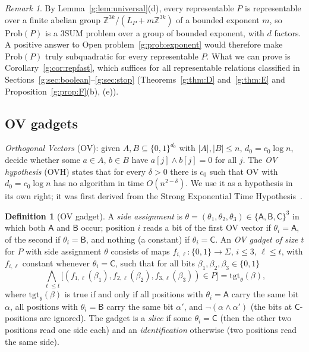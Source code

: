\documentclass[11pt]{article}
\theoremstyle{definition}
\newtheorem{definition}[theorem]{Definition}
\theoremstyle{remark}
\newtheorem{remark}[theorem]{Remark}
\newcommand{\Z}{\mathbb{Z}}
\newcommand{\Prob}{\mathrm{Prob}}
\begin{document}
\begin{remark}\label{g:rem:repexp}
By Lemma~\ref{g:lem:universal}(d), every representable $P$ is representable over a finite abelian group $\Z^{3k}/(L_P+m\Z^{3k})$ of a bounded exponent $m$, so $\Prob(P)$ is a 3SUM problem over a group of bounded exponent, with $d$ factors. A positive answer to Open problem~\ref{g:prob:exponent} would therefore make $\Prob(P)$ truly subquadratic for every representable $P$. What we can prove is Corollary~\ref{g:cor:repfast}, which suffices for all representable relations classified in Sections~\ref{g:sec:boolean}--\ref{g:sec:stop} (Theorems~\ref{g:thm:D} and~\ref{g:thm:E} and Proposition~\ref{g:prop:F}(b), (e)).
\end{remark}

\subsection{OV gadgets}\label{g:sec:gadgets}

\emph{Orthogonal Vectors} (OV): given $A,B\subseteq\{0,1\}^{d_0}$ with $|A|,|B|\le n$, $d_0=c_0\log n$, decide whether some $a\in A$, $b\in B$ have $a[j]\wedge b[j]=0$ for all $j$. The \emph{OV hypothesis} (OVH) states that for every $\delta>0$ there is $c_0$ such that OV with $d_0=c_0\log n$ has no algorithm in time $O(n^{2-\delta})$. We use it as a hypothesis in its own right; it was first derived from the Strong Exponential Time Hypothesis~\cite{Wil05}.

\begin{definition}[OV gadget]\label{g:def:gadget}
A \emph{side assignment} is $\theta=(\theta_1,\theta_2,\theta_3)\in\{\mathsf A,\mathsf B,\mathsf C\}^3$ in which both $\mathsf A$ and $\mathsf B$ occur; position $i$ reads a bit of the first OV vector if $\theta_i=\mathsf A$, of the second if $\theta_i=\mathsf B$, and nothing (a constant) if $\theta_i=\mathsf C$. An \emph{OV gadget of size $t$} for $P$ with side assignment $\theta$ consists of maps $f_{i,\ell}\colon\{0,1\}\to\Sigma$, $i\le3$, $\ell\le t$, with $f_{i,\ell}$ constant whenever $\theta_i=\mathsf C$, such that for all bits $\beta_1,\beta_2,\beta_3\in\{0,1\}$
\[
\bigwedge_{\ell\le t}\bigl[(f_{1,\ell}(\beta_1),f_{2,\ell}(\beta_2),f_{3,\ell}(\beta_3))\in P\bigr]=\mathrm{tgt}_\theta(\beta),
\]
where $\mathrm{tgt}_\theta(\beta)$ is true if and only if all positions with $\theta_i=\mathsf A$ carry the same bit $\alpha$, all positions with $\theta_i=\mathsf B$ carry the same bit $\alpha'$, and $\neg(\alpha\wedge\alpha')$ (the bits at $\mathsf C$-positions are ignored). The gadget is a \emph{slice} if some $\theta_i=\mathsf C$ (then the other two positions read one side each) and an \emph{identification} otherwise (two positions read the same side).
\end{definition}
\end{document}
